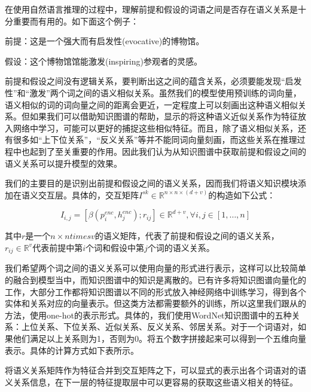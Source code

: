 \documentclass[UTF8,11pt,a4paper,nofonts]{ctexart}
\begin{document}

在使用自然语言推理的过程中，理解前提和假设的词语之间是否存在语义关系是十分重要而有用的。如下面这个例子：
    

前提：这是一个强大而有启发性(evocative)的博物馆。

假设：这个博物馆馆能激发(inspiring)参观者的灵感。

前提和假设之间没有逻辑关系，要判断出这之间的蕴含关系，必须要能发现“启发性”和“激发”两个词之间的语义相似关系。虽然我们的模型使用预训练的词向量，语义相似的词的词向量之间的距离会更近，一定程度上可以刻画出这种语义相似关系。但如果我们可以借助知识图谱的帮助，显示的将这种语义近似关系作为特征放入网络中学习，可能可以更好的捕捉这些相似特征。而且，除了语义相似关系，还有很多如“上下位关系”，“反义关系”等并不能同词向量刻画，而这些关系在推理过程中也起到了至关重要的作用。因此我们认为从知识图谱中获取前提和假设之间的语义关系可以提升模型的效果。


我们的主要目的是识别出前提和假设之间的语义关系，因而我们将语义知识模块添加在语义交互层。具体的，交互矩阵$I^{sk} \in \mathbb{R}^{n \times n \times (d+v)}$的构造如下公式：

\begin{equation}
I_{i,j} = [\beta(p^{enc}_i, h^{enc}_j); r_{ij}] \in \mathbb{R}^{d+v}, \forall i, j \in [1,\dots,n]
\end{equation}

其中$r$是一个$n\times n times v$的语义矩阵，代表了前提和假设之间的语义关系，$r_{ij} \in \mathbb{R}^v$代表前提中第$i$个词和假设中第$j$个词的语义关系。

我们希望两个词之间的语义关系可以使用向量的形式进行表示，这样可以比较简单的融合到模型当中，而知识图谱中的知识是离散的。已有许多将知识图谱向量化的工作\cite{}，大部分工作都将知识图谱以不同的形式放入神经网络中训练学习，得到各个实体和关系对应的向量表示。但这类方法都需要额外的训练，所以这里我们跟从\cite{}的方法，使用one-hot的表示形式。具体的，我们使用WordNet知识图谱中的五种关系：上位关系、下位关系、近似关系、反义关系、邻居关系。对于一个词语对，如果他们满足以上关系则为1，否则为0。将五个数字拼接起来可以得到一个五维向量表示。具体的计算方式如下表所示。

将语义关系矩阵作为特征合并到交互矩阵之下，可以显式的表示出各个词语对的语义关系信息，在下一层的特征提取层中可以更容易的获取这些语义相关的特征。
\end{document}
